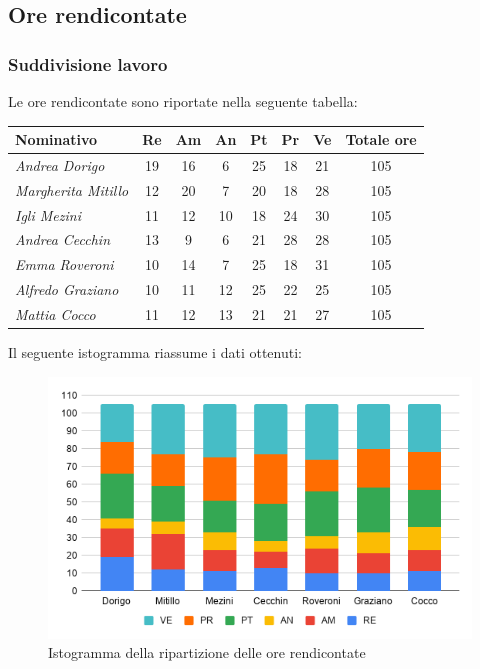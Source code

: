 {{{{{{{{{{{{\subsection{Ore rendicontate}\label{PreventivoRiepilogoOreRendicontate}

\subsubsection{Suddivisione lavoro}\label{PreventivoRiepilogoOreRendicontateSuddivisioneLavoro}
Le ore rendicontate sono riportate nella seguente tabella:
\quad
\def\tabularxcolumn#1{m{#1}}
{

	\begin{center}
		\renewcommand{\arraystretch}{1.4}
		\begin{tabularx}{\textwidth}{|X|c|c|c|c|c|c|c|}
			\hline
			\rowcolor{airforceblue}
			\textbf{Nominativo} & \textbf{Re} & \textbf{Am} & \textbf{An} & \textbf{Pt} & \textbf{Pr} & \textbf{Ve} & \textbf{Totale ore}\\
			\hline
			\textit{Andrea Dorigo} & 19 & 16 & 6 & 25 & 18 & 21 & 105\\
			\hline
			\textit{Margherita Mitillo} & 12 & 20 & 7 & 20 & 18 & 28 & 105\\
			\hline
			\textit{Igli Mezini} & 11 & 12 & 10 & 18 & 24 & 30 & 105\\
			\hline
			\textit{Andrea Cecchin} & 13 & 9 & 6 & 21 & 28 & 28 & 105\\
			\hline
			\textit{Emma Roveroni} & 10 & 14 & 7 & 25 & 18 & 31 & 105\\
			\hline
			\textit{Alfredo Graziano} & 10 & 11 & 12 & 25 & 22 & 25 & 105\\
			\hline
			\textit{Mattia Cocco} & 11 & 12 & 13 & 21 & 21 & 27 & 105\\
			\hline
		\end{tabularx}
	\end{center}
Il seguente istogramma riassume i dati ottenuti:
\begin{figure}[!ht]
	\begin{center}
		\includegraphics[width=0.8\linewidth]{../immagini/pdp/istogramma_rendicontate.png}
		\caption{Istogramma della ripartizione delle ore rendicontate}
	\end{center}
\end{figure}

}}}}}}}}}}}}}
